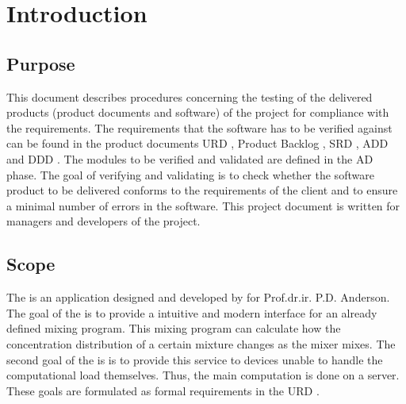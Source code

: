 \chapter{Introduction}

\section{Purpose}
   This document describes procedures concerning the testing of the delivered products (product
   documents and software) of the \projectname{} project for compliance with the requirements. The
   requirements that the software has to be verified against can be found in the product documents
   URD \cite{urd}, Product Backlog \cite{backlog}, SRD \cite{srd}, ADD \cite{add} and DDD \cite{ddd}. The modules to be verified and validated are defined
   in the AD phase. The goal of verifying and validating is to check whether the software product to
   be delivered conforms to the requirements of the client and to ensure a minimal number of errors
   in the software. This project document is written for managers and developers of the \projectname{}
   project.

\section{Scope}
The \applicationname{} is an application designed and developed by \projectauthor{} for Prof.dr.ir. P.D. Anderson. The goal of the \applicationname{} is to provide a intuitive and modern interface for an already defined mixing program. This mixing program can calculate how the concentration distribution of a certain mixture changes as the mixer mixes. The second goal of the \applicationname{} is is to provide this service to devices unable to handle the computational load themselves. Thus, the main computation is done on a server. These goals are formulated as formal requirements in the  URD \cite{urd}.

